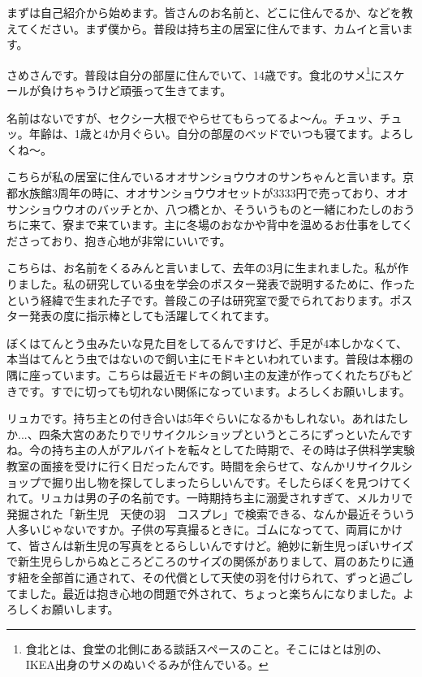 \documentclass[9pt,4aj]{jsarticle}
\begin{document}
\begin{multicols}{2}
まずは自己紹介から始めます。皆さんのお名前と、どこに住んでるか、などを教えてください。まず僕から。普段は持ち主の居室に住んでます、カムイと言います。

さめさんです。普段は自分の部屋に住んでいて、14歳です。食北のサメ\footnote{食北とは、食堂の北側にある談話スペースのこと。そこにはとは別の、IKEA出身のサメのぬいぐるみが住んでいる。}にスケールが負けちゃうけど頑張って生きてます。

名前はないですが、セクシー大根でやらせてもらってるよ～ん。チュッ、チュッ。年齢は、1歳と4か月ぐらい。自分の部屋のベッドでいつも寝てます。よろしくね～。

こちらが私の居室に住んでいるオオサンショウウオのサンちゃんと言います。京都水族館3周年の時に、オオサンショウウオセットが3333円で売っており、オオサンショウウオのバッチとか、八つ橋とか、そういうものと一緒にわたしのおうちに来て、寮まで来ています。主に冬場のおなかや背中を温めるお仕事をしてくださっており、抱き心地が非常にいいです。

こちらは、お名前をくるみんと言いまして、去年の3月に生まれました。私が作りました。私の研究している虫を学会のポスター発表で説明するために、作ったという経緯で生まれた子です。普段この子は研究室で愛でられております。ポスター発表の度に指示棒としても活躍してくれてます。

ぼくはてんとう虫みたいな見た目をしてるんですけど、手足が4本しかなくて、本当はてんとう虫ではないので飼い主にモドキといわれています。普段は本棚の隅に座っています。こちらは最近モドキの飼い主の友達が作ってくれたちびもどきです。すでに切っても切れない関係になっています。よろしくお願いします。

リュカです。持ち主との付き合いは5年ぐらいになるかもしれない。あれはたしか...、四条大宮のあたりでリサイクルショップというところにずっといたんですね。今の持ち主の人がアルバイトを転々としてた時期で、その時は子供科学実験教室の面接を受けに行く日だったんです。時間を余らせて、なんかリサイクルショップで掘り出し物を探してしまったらしいんです。そしたらぼくを見つけてくれて。リュカは男の子の名前です。一時期持ち主に溺愛されすぎて、メルカリで発掘された「新生児　天使の羽　コスプレ」で検索できる、なんか最近そういう人多いじゃないですか。子供の写真撮るときに。ゴムになってて、両肩にかけて、皆さんは新生児の写真をとるらしいんですけど。絶妙に新生児っぽいサイズで新生児らしからぬところどころのサイズの関係がありまして、肩のあたりに通す紐を全部首に通されて、その代償として天使の羽を付けられて、ずっと過ごしてました。最近は抱き心地の問題で外されて、ちょっと楽ちんになりました。よろしくお願いします。


\end{multicols}
\end{document}
